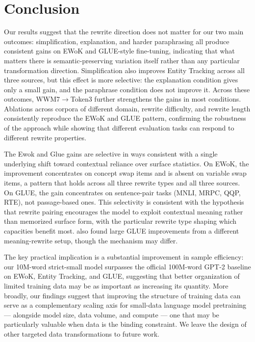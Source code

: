 \documentclass[11pt]{article}
\begin{document}
\section{Conclusion}
\label{sec:conclusion}
Our results suggest that the rewrite direction does not matter for our two main outcomes: simplification, explanation, and harder paraphrasing all produce consistent gains on EWoK and GLUE-style fine-tuning, indicating that what matters there is semantic-preserving variation itself rather than any particular transformation direction. Simplification also improves Entity Tracking across all three sources, but this effect is more selective: the explanation condition gives only a small gain, and the paraphrase condition does not improve it. Across these outcomes, WWM7$\to$Token3 further strengthens the gains in most conditions. Ablations across corpora of different domain, rewrite difficulty, and rewrite length consistently reproduce the EWoK and GLUE pattern, confirming the robustness of the approach while showing that different evaluation tasks can respond to different rewrite properties.

The Ewok and Glue gains are selective in ways consistent with a single underlying shift toward contextual reliance over surface statistics. On EWoK, the improvement concentrates on concept swap items and is absent on variable swap items, a pattern that holds across all three rewrite types and all three sources. On GLUE, the gain concentrates on sentence-pair tasks (MNLI, MRPC, QQP, RTE), not passage-based ones. This selectivity is consistent with the hypothesis that rewrite pairing encourages the model to exploit contextual meaning rather than memorized surface form, with the particular rewrite type shaping which capacities benefit most. \citet{edman2024babylms} also found large GLUE improvements from a different meaning-rewrite setup, though the mechanism may differ.

The key practical implication is a substantial improvement in sample efficiency: our 10M-word strict-small model surpasses the official 100M-word GPT-2 baseline on EWoK, Entity Tracking, and GLUE, suggesting that better organization of limited training data may be as important as increasing its quantity. More broadly, our findings suggest that improving the structure of training data can serve as a complementary scaling axis for small-data language model pretraining --- alongside model size, data volume, and compute --- one that may be particularly valuable when data is the binding constraint. We leave the design of other targeted data transformations to future work.
\end{document}
